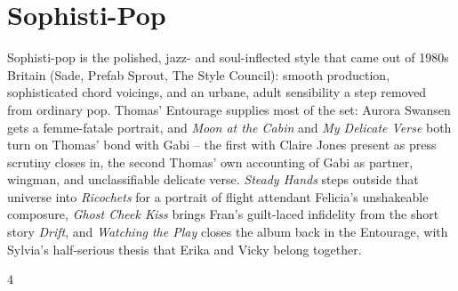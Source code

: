 \documentclass[a4paper,landscape]{memoir}
\begin{document}
\chapter{Sophisti-Pop}
Sophisti-pop is the polished, jazz- and soul-inflected style that came out of 1980s Britain (Sade, Prefab Sprout, The Style Council): smooth production, sophisticated chord voicings, and an urbane, adult sensibility a step removed from ordinary pop. Thomas' Entourage supplies most of the set: Aurora Swansen gets a femme-fatale portrait, and \emph{Moon at the Cabin} and \emph{My Delicate Verse} both turn on Thomas' bond with Gabi -- the first with Claire Jones present as press scrutiny closes in, the second Thomas' own accounting of Gabi as partner, wingman, and unclassifiable delicate verse. \emph{Steady Hands} steps outside that universe into \emph{Ricochets} for a portrait of flight attendant Felicia's unshakeable composure, \emph{Ghost Cheek Kiss} brings Fran's guilt-laced infidelity from the short story \emph{Drift}, and \emph{Watching the Play} closes the album back in the Entourage, with Sylvia's half-serious thesis that Erika and Vicky belong together.
\clearpage\begin{multicols*}{4}
\end{multicols*}
\end{document}
